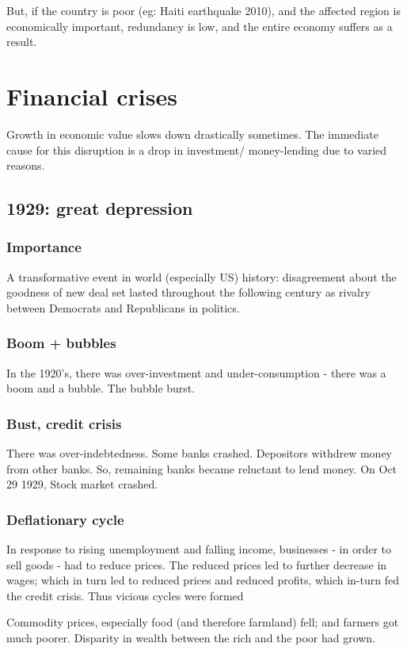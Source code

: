 \documentclass[oneside, article]{memoir}
\begin{document}
But, if the country is poor (eg: Haiti earthquake 2010), and the affected region is economically important, redundancy is low, and the entire economy suffers as a result.

\section{Financial crises}
Growth in economic value slows down drastically sometimes. The immediate cause for this disruption is a drop in investment/ money-lending due to varied reasons.

\subsection{1929: great depression}
\subsubsection{Importance}
A transformative event in world (especially US) history: disagreement about the goodness of new deal set lasted throughout the following century as rivalry between Democrats and Republicans in politics.

\subsubsection{Boom + bubbles}
In the 1920's, there was over-investment and under-consumption - there was a boom and a bubble. The bubble burst.

\subsubsection{Bust, credit crisis}
There was over-indebtedness. Some banks crashed. Depositors withdrew money from other banks.  So, remaining banks became reluctant to lend money. On Oct 29 1929, Stock market crashed.

\subsubsection{Deflationary cycle}
In response to rising unemployment and falling income, businesses - in order to sell goods - had to reduce prices. The reduced prices led to further decrease in wages; which in turn led to reduced prices and reduced profits, which in-turn fed the credit crisis. Thus vicious cycles were formed

Commodity prices, especially food (and therefore farmland) fell; and farmers got much poorer. Disparity in wealth between the rich and the poor had grown.
\end{document}
